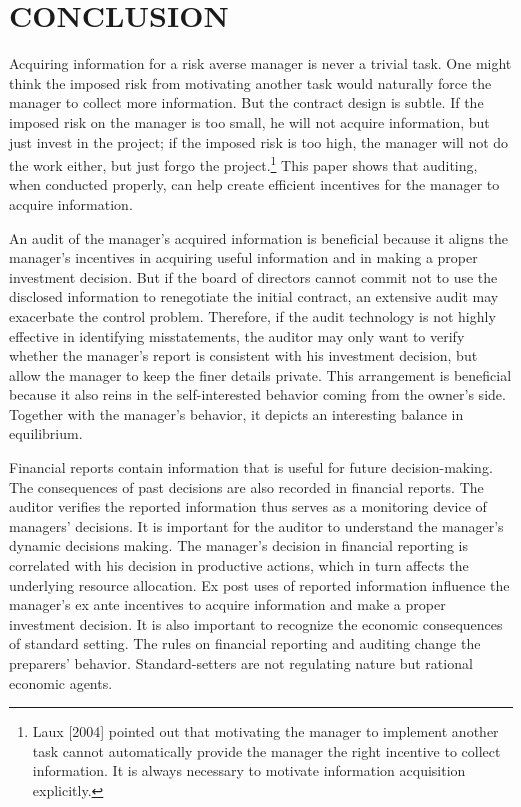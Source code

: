 \chapter{CONCLUSION}

Acquiring information for a risk averse manager is never a trivial
task. One might think the imposed risk from motivating another task
would naturally force the manager to collect more information. But
the contract design is subtle. If the imposed risk on the manager is
too small, he will not acquire information, but just invest in the
project; if the imposed risk is too high, the manager will not do
the work either, but just
forgo the project.\footnote{%
\footnotesize{Laux [2004] pointed out that
motivating the manager to implement another task cannot
automatically provide the manager the right incentive to collect
information. It is always necessary to motivate information
acquisition explicitly.}} This paper shows that auditing, when
conducted properly, can help create efficient incentives for the
manager to acquire information.

An audit of the manager's acquired information is beneficial because
it aligns the manager's incentives in acquiring useful information
and in making a proper investment decision. But if the board of
directors cannot commit not to use the disclosed information to
renegotiate the initial contract, an extensive audit may exacerbate
the control problem. Therefore, if the audit technology is not
highly effective in identifying misstatements, the auditor may only
want to verify whether the manager's report is consistent with his
investment decision, but allow the manager to keep the finer details
private. This arrangement is beneficial because it also reins in the
self-interested behavior coming from the owner's side. Together with
the manager's behavior, it depicts an interesting balance in
equilibrium.

Financial reports contain information that is useful for future
decision-making. The consequences of past decisions are also
recorded in financial reports. The auditor verifies the reported
information thus serves as a monitoring device of managers'
decisions. It is important for the auditor to understand the
manager's dynamic decisions making. The manager's decision in
financial reporting is correlated with his decision in productive
actions, which in turn affects the underlying resource allocation.
Ex post uses of reported information influence the manager's ex ante
incentives to acquire information and make a proper investment
decision. It is also important to recognize the economic
consequences of standard setting. The rules on financial reporting
and auditing change the preparers' behavior. Standard-setters are
not regulating nature but rational economic agents.

